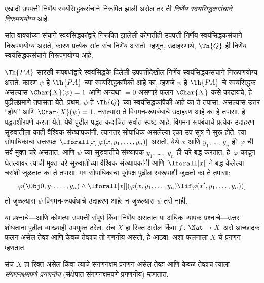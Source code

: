\begin{defn}
एखादी उपपत्ती निर्णेय स्वयंसिद्धकसंचाने निरूपित झाली असेल तर ती
\emph{निर्णेय स्वयंसिद्धकसंचाने निरूपणयोग्य} आहे.
\end{defn}

\begin{ex}
सांत वाक्यांच्या संचाने स्वयंसिद्धकांद्वारे निरूपित
झालेली कोणतीही उपपत्ती निर्णेय स्वयंसिद्धकसंचाने निरूपणयोग्य असते, कारण प्रत्येक
सांत संच निर्णेय असतो. म्हणून, उदाहरणार्थ, $\Th{Q}$ ही
निर्णेय स्वयंसिद्धकसंचाने निरूपणयोग्य आहे.

$\Th{PA}$ सारखी रूपबंधांद्वारे स्वयंसिद्धके दिलेली उपपत्तीदेखील
निर्णेय स्वयंसिद्धकसंचाने निरूपणयोग्य असते. कारण $\psi$ हे $\Th{PA}$ च्या स्वयंसिद्धकांपैकी
आहे का, म्हणजे $\psi$ हे $\Th{PA}$ चे स्वयंसिद्धक असल्यास
$\Char{X}(\psi) = 1$ आणि
अन्यथा $= 0$ असणारे फलन $\Char{X}$ कसे काढायचे, हे पुढीलप्रमाणे
तपासता येते. प्रथम, $\psi$ हे $\Th{Q}$ च्या स्वयंसिद्धकांपैकी आहे
का ते तपासा. असल्यास उत्तर ``होय'' आणि $\Char{X}(\psi) = 1$.
नसल्यास ते विगमन-रूपबंधाचे उदाहरण आहे का हे तपासा. हे पद्धतशीरपणे
करता येते. येथे पुढील पद्धत कदाचित सर्वात स्पष्ट आहे: विगमन-रूपबंधाचे
प्रत्येक उदाहरण सुरुवातीला काही वैश्विक संख्यापकांनी, त्यानंतर
सोपाधिक असलेल्या एका उप-सूत्र ने सुरू होते. त्या सोपाधिकाचा
उत्तरपक्ष $\lforall[x][\varphi(x, y_1, \dots, y_n)]$ असतो. येथे $x$
आणि $y_1$, \dots, $y_n$ ही~$\varphi$ ची सर्व मुक्त चरे असतात, आणि
$\psi$ च्या सुरुवातीचे संख्यापक $y_1$, \dots,~$y_n$ ही चरे बद्ध
करतात. हे~$\varphi$ काढून घेतल्यावर त्याची मुक्त चरे सुरुवातीच्या
वैश्विक संख्यापकांनी आणि~$\lforall[x]$ ने बद्ध केलेल्या चरांशी
जुळतात का ते तपासा. मग सोपाधिकाचा पूर्वपक्ष पुढील स्वरूपाशी जुळतो
का ते तपासा:
\[\varphi(\Obj 0, y_1, \dots, y_n) \land \lforall[x][(\varphi(x, y_1, \dots, y_n)
\lif \varphi(x', y_1, \dots, y_n))]
\]
तो जुळल्यास $\psi$ विगमन-रूपबंधाचे उदाहरण आहे; न जुळल्यास $\psi$ तसे नाही.
\end{ex}

या प्रश्नाचे---आणि कोणत्या उपपत्ती संपूर्ण किंवा निर्णेय असतात या
अधिक व्यापक प्रश्नाचे---उत्तर शोधताना पुढील व्याख्याही उपयुक्त ठरेल.
संच $X$ हा रिक्त असेल किंवा $f \colon \Nat
\to X$ असे आच्छादक फलन असेल तेव्हा आणि केवळ तेव्हाच तो गणनीय
असतो, हे आठवा. अशा फलनाला $X$ चे प्रगणन म्हणतात.

\begin{defn}
संच $X$ हा रिक्त असेल किंवा त्याचे संगणनक्षम प्रगणन असेल तेव्हा आणि केवळ तेव्हाच
त्याला \emph{संगणनक्षमपणे प्रगणनीय} (संक्षेपात संगणनक्षमपणे प्रगणनीय) म्हणतात.
\end{defn}

